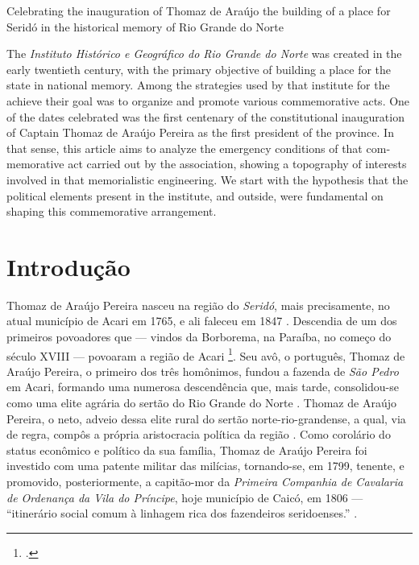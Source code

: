 \begin{refsection}
    \begin{otherlanguage}{english}
    
    \fakeChapterTwoLines
    {Celebrating the inauguration of Thomaz de Araújo}
    {the building of a place for Seridó in the historical memory of Rio Grande do Norte}

    \begin{galoResumo}[Abstract]
        The \textit{Instituto Histórico e Geográfico do Rio Grande do Norte} was created in the early twentieth century, with the primary objective of building a place for the state in national memory. Among the strategies used by that institute for the achieve their goal was to organize and promote various commemorative acts. One of the dates celebrated was the first centenary of the constitutional inauguration of Captain Thomaz de Araújo Pereira as the first president of the province. In that sense, this article aims to analyze the emergency conditions of that commemorative act carried out by the association, showing a topography of interests involved in that memorialistic engineering. We start with the hypothesis that the political elements present in the institute, and outside, were fundamental on shaping this commemorative arrangement.
    \end{galoResumo}
    
    \end{otherlanguage}

    \section{Introdução}

    Thomaz de Araújo Pereira nasceu na região do \textit{Seridó}, mais precisamente, no atual município de Acari em 1765, e ali faleceu em 1847 \cite[p.~815]{Lyra1921Historia}. Descendia de um dos primeiros povoadores que --- vindos da Borborema, na Paraíba, no começo do século XVIII --- povoaram a região de Acari \footcite[p.~180]{DiscursoManoealDantas}. Seu avô, o português, Thomaz de Araújo Pereira, o primeiro dos três homônimos, fundou a fazenda de \textit{São Pedro} em Acari, formando uma numerosa descendência que, mais tarde, consolidou-se como uma elite agrária do sertão do Rio Grande do Norte \cite[p.~53]{Macedo2012Penultima}. Thomaz de Araújo Pereira, o neto, adveio dessa elite rural do sertão norte-rio-grandense, a qual, via de regra, compôs a própria aristocracia política da região \cite[p.~53]{Macedo2012Penultima}. Como corolário do status econômico e político da sua família, Thomaz de Araújo Pereira foi investido com uma patente militar das milícias, tornando-se, em 1799, tenente, e promovido, posteriormente, a capitão-mor da \textit{Primeira Companhia de Cavalaria de Ordenança da Vila do Príncipe}, hoje município de Caicó, em 1806 --- ``itinerário social comum à linhagem rica dos fazendeiros seridoenses.'' \cite[p.~54]{Macedo2012Penultima}.


\end{refsection}
